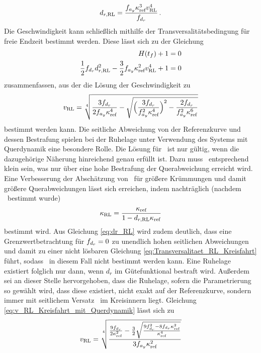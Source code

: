 \begin{equation}
d_{r,\textrm{RL}} = \frac{f_{a_y}\kappa_{\textrm{ref}}^3v_{\textrm{RL}}^4}{f_{d_r}}\,.
\end{equation}
Die Geschwindigkeit kann schließlich mithilfe der Transversalitätsbedingung für freie Endzeit bestimmt werden. Diese lässt sich zu der Gleichung
\begin{align}
H(t_f) + 1 &= 0\\
\frac{1}{2}f_{d_r}d_{r,\textrm{RL}}^2 - \frac{3}{2}f_{a_y}\kappa_{\textrm{ref}}^2v_{\textrm{RL}}^4 + 1 &= 0 \label{eq:Transversalitaet_RL_Kreisfahrt}
\end{align}
zusammenfassen, aus der die Lösung der Geschwindigkeit zu 
\begin{equation}
v_{\textrm{RL}} = \sqrt[4]{\frac{3f_{d_r}}{2f_{a_y}\kappa_{\textrm{ref}}^4}-\sqrt{\Big(\frac{3f_{d_r}}{f_{a_y}^2\kappa_{\textrm{ref}}^4}\Big)^2 - \frac{2f_{d_r}}{f_{a_y}^2\kappa_{\textrm{ref}}^6}}} \label{eq:v_RL_Kreisfahrt_mit_Querdynamik}
\end{equation}
bestimmt werden kann. Die seitliche Abweichung von der Referenzkurve und dessen Bestrafung spielen bei der Ruhelage unter Verwendung des Systems mit Querdynamik eine besondere Rolle. Die Lösung für \kappaRL~ist nur gültig, wenn die dazugehörige Näherung hinreichend genau erfüllt ist. Dazu muss \drRL~entsprechend klein sein, was nur über eine hohe Bestrafung der Querabweichung erreicht wird. Eine Verbesserung der Abschätzung von \kappaRL~für größere Krümmungen und damit größere Querabweichungen lässt sich erreichen, indem nachträglich (nachdem \drRL~bestimmt wurde)
\begin{equation}
	\kappa_{\textrm{RL}} = \frac{\kappa_{\textrm{ref}}}{1-d_{r,\textrm{RL}}\kappa_{\textrm{ref}}} \label{eq:kappaRL_exakt}
\end{equation}
bestimmt wird. Aus Gleichung \eqref{eq:dr_RL} wird zudem deutlich, dass eine Grenzwertbetrachtung für $f_{d_r}=0$ zu unendlich hohen seitlichen Abweichungen und damit zu einer nicht lösbaren Gleichung \eqref{eq:Transversalitaet_RL_Kreisfahrt} führt, sodass \vRL~in diesem Fall nicht bestimmt werden kann. Eine Ruhelage existiert folglich nur dann, wenn $d_r$ im Gütefunktional bestraft wird. Außerdem sei an dieser Stelle hervorgehoben, dass die Ruhelage, sofern die Parametrierung so gewählt wird, dass diese existiert, nicht exakt auf der Referenzkurve, sondern immer mit seitlichem Versatz \drRL~im Kreisinnern liegt. Gleichung \eqref{eq:v_RL_Kreisfahrt_mit_Querdynamik} lässt sich zu 
\begin{equation}
v_{\textrm{RL}} = \sqrt[4]{\frac{\frac{9f_{d_r}}{2\kappa_{\textrm{ref}}^2}-\frac{3}{2}\sqrt{\frac{9f_{d_r}^2-8f_{d_r}\kappa_{\textrm{ref}}^2}{\kappa_{\textrm{ref}}^4}}}{3f_{a_y}\kappa_{\textrm{ref}}^2}} \label{eq:v_RL_Kreisfahrt_mit_Querdynamik_umform}
\end{equation}
